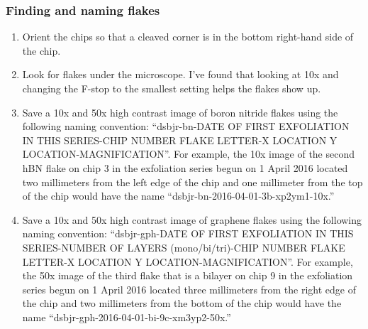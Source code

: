 \begin{appendices}
\subsubsection{Finding and naming flakes}
\begin{enumerate}
	\item Orient the chips so that a cleaved corner is in the bottom right-hand side of the chip.
	\item Look for flakes under the microscope. I’ve found that looking at 10x and changing the F-stop to the smallest setting helps the flakes show up.
	\item Save a 10x and 50x high contrast image of boron nitride flakes using the following naming convention: ``dsbjr-bn-DATE OF FIRST EXFOLIATION IN THIS SERIES-CHIP NUMBER FLAKE LETTER-X LOCATION Y LOCATION-MAGNIFICATION''. For example, the 10x image of the second hBN flake on chip 3 in the exfoliation series begun on 1 April 2016 located two millimeters from the left edge of the chip and one millimeter from the top of the chip would have the name ``dsbjr-bn-2016-04-01-3b-xp2ym1-10x.''
	\item Save a 10x and 50x high contrast image of graphene flakes using the following naming convention: ``dsbjr-gph-DATE OF FIRST EXFOLIATION IN THIS SERIES-NUMBER OF LAYERS (mono/bi/tri)-CHIP NUMBER FLAKE LETTER-X LOCATION Y LOCATION-MAGNIFICATION''. For example, the 50x image of the third flake that is a bilayer on chip 9 in the exfoliation series begun on 1 April 2016 located three millimeters from the right edge of the chip and two millimeters from the bottom of the chip would have the name ``dsbjr-gph-2016-04-01-bi-9c-xm3yp2-50x.''
\end{enumerate}


\end{appendices}
